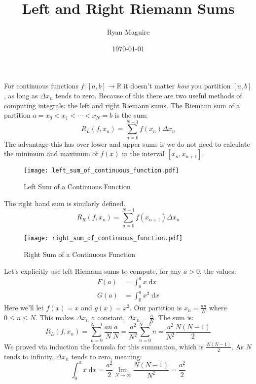 \documentclass{article}
\title{Left and Right Riemann Sums}
\author{Ryan Maguire}
\date{\today}
\begin{document}
    \maketitle
    For continuous functions $f:[a,b]\rightarrow\mathbb{R}$ it doesn't matter
    \textit{how} you partition $[a,b]$, as long as $\Delta{x}_{n}$ tends to
    zero. Because of this there are two useful methods of computing integrals:
    the left and right Riemann sums. The Riemann sum of a partition
    $a=x_{0}<x_{1}<\cdots<x_{N}=b$ is the sum:
    \begin{equation}
        R_{L}(f,x_{n})=\sum_{n=0}^{N-1}f(x_{n})\Delta{x}_{n}
    \end{equation}
    The advantage this has over lower and upper sums is we do not need to
    calculate the minimum and maximum of $f(x)$ in the interval
    $[x_{n},x_{n+1}]$.
    \begin{figure}
        \centering
        \texttt{[image: left\_sum\_of\_continuous\_function.pdf]}
        \caption{Left Sum of a Continuous Function}
    \end{figure}
    The right hand sum is similarly defined.
    \begin{equation}
        R_{R}(f,x_{n})=\sum_{n=0}^{N-1}f(x_{n+1})\Delta{x}_{n}
    \end{equation}
    \begin{figure}
        \centering
        \texttt{[image: right\_sum\_of\_continuous\_function.pdf]}
        \caption{Right Sum of a Continuous Function}
    \end{figure}
    Let's explicitly use left Riemann sums to compute, for any $a>0$, the
    values:
    \begin{align}
        F(a)&=\int_{0}^{a}x\;\textrm{d}x\\
        G(a)&=\int_{0}^{a}x^{2}\;\textrm{d}x
    \end{align}
    Here we'll let $f(x)=x$ and $g(x)=x^{2}$.
    Our partition is $x_{n}=\frac{an}{N}$ where $0\leq{n}\leq{N}$. This makes
    $\Delta{x}_{n}$ a constant, $\Delta{x}_{n}=\frac{a}{N}$. The sum is:
    \begin{equation}
        R_{L}(f,x_{n})=\sum_{n=0}^{N-1}\frac{an}{N}\frac{a}{N}
            =\frac{a^{2}}{N^{2}}\sum_{n=0}^{N-1}n
            =\frac{a^{2}}{N^{2}}\frac{N(N-1)}{2}
    \end{equation}
    We proved via induction the formula for this summation, which is
    $\frac{N(N-1)}{2}$. As $N$ tends to infinity, $\Delta{x}_{n}$ tends to zero,
    meaning:
    \begin{equation}
        \int_{0}^{a}x\;\textrm{d}x
            =\frac{a^{2}}{2}\lim_{N\rightarrow\infty}\frac{N(N-1)}{N^{2}}
            =\frac{a^{2}}{2}
    \end{equation}
\end{document}
